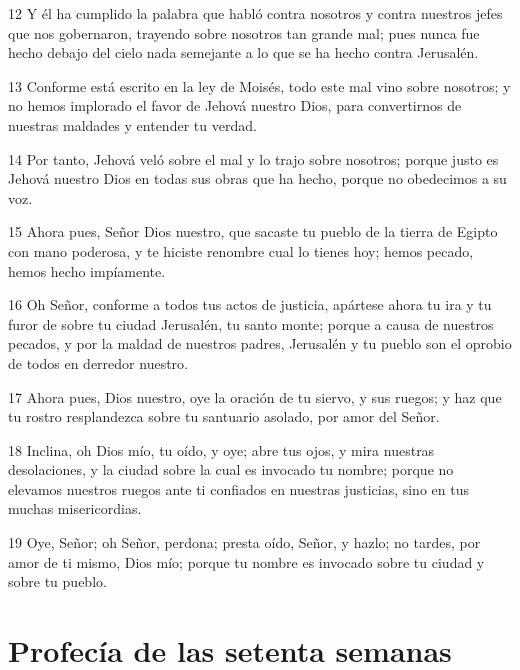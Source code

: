 \par 12 Y él ha cumplido la palabra que habló contra nosotros y contra nuestros jefes que nos gobernaron, trayendo sobre nosotros tan grande mal; pues nunca fue hecho debajo del cielo nada semejante a lo que se ha hecho contra Jerusalén.
\par 13 Conforme está escrito en la ley de Moisés, todo este mal vino sobre nosotros; y no hemos implorado el favor de Jehová nuestro Dios, para convertirnos de nuestras maldades y entender tu verdad.
\par 14 Por tanto, Jehová veló sobre el mal y lo trajo sobre nosotros; porque justo es Jehová nuestro Dios en todas sus obras que ha hecho, porque no obedecimos a su voz.
\par 15 Ahora pues, Señor Dios nuestro, que sacaste tu pueblo de la tierra de Egipto con mano poderosa, y te hiciste renombre cual lo tienes hoy; hemos pecado, hemos hecho impíamente.
\par 16 Oh Señor, conforme a todos tus actos de justicia, apártese ahora tu ira y tu furor de sobre tu ciudad Jerusalén, tu santo monte; porque a causa de nuestros pecados, y por la maldad de nuestros padres, Jerusalén y tu pueblo son el oprobio de todos en derredor nuestro.
\par 17 Ahora pues, Dios nuestro, oye la oración de tu siervo, y sus ruegos; y haz que tu rostro resplandezca sobre tu santuario asolado, por amor del Señor.
\par 18 Inclina, oh Dios mío, tu oído, y oye; abre tus ojos, y mira nuestras desolaciones, y la ciudad sobre la cual es invocado tu nombre; porque no elevamos nuestros ruegos ante ti confiados en nuestras justicias, sino en tus muchas misericordias.
\par 19 Oye, Señor; oh Señor, perdona; presta oído, Señor, y hazlo; no tardes, por amor de ti mismo, Dios mío; porque tu nombre es invocado sobre tu ciudad y sobre tu pueblo.

\section*{Profecía de las setenta semanas}

